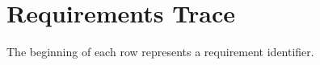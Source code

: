 \documentclass[titlepage]{article}
\begin{document}
\pagebreak
\section{Requirements Trace}
\label{sec:requirements}

The beginning of each row represents a requirement identifier.
\vspace{5pt}

\begin{center}
\small\addtolength{\tabcolsep}{-3pt}


\begin{tabular}{ | c ||c | c | c | c | c | c | c | c | c | c | c | c | c | c | c | c | c | c | c | c | c | c | c | c | c | c | c | c | c | c | c | c | c | c | c |}
\hline

\end{tabular}
\end{center}
\end{document}
